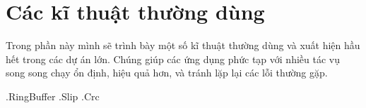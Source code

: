 \chapter{Các kĩ thuật thường dùng}

Trong phần này mình sẽ trình bày một số kĩ thuật thường dùng và xuất hiện hầu hết trong các dự án lớn. Chúng giúp các ứng dụng phức tạp với nhiều tác vụ song song chạy ổn định, hiệu quả hơn, và tránh lặp lại các lỗi thường gặp.

.{RingBuffer}
.{Slip}
.{Crc}